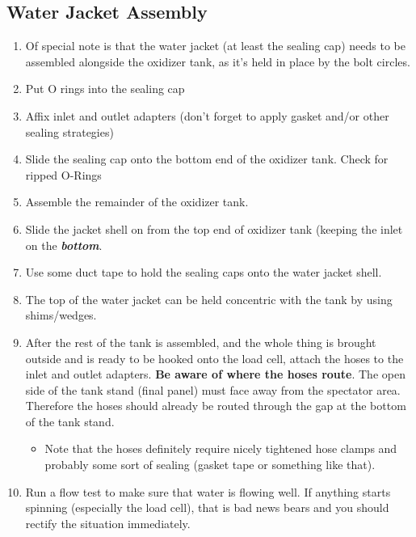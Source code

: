 \documentclass[11pt]{article}
\begin{document}
\subsection{Water Jacket Assembly}

\begin{enumerate}
	\item Of special note is that the water jacket (at least the sealing cap) needs to be assembled alongside the oxidizer tank, as it's held in place by the bolt circles.
	\item Put O rings into the sealing cap
	\item Affix inlet and outlet adapters (don't forget to apply gasket and/or other sealing strategies)
	\item Slide the sealing cap onto the bottom end of the oxidizer tank. Check for ripped O-Rings
	\item Assemble the remainder of the oxidizer tank.
	\item Slide the jacket shell on from the top end of oxidizer tank (keeping the inlet on the \textbf{\textit{bottom}}.
	\item Use some duct tape to hold the sealing caps onto the water jacket shell.
	\item The top of the water jacket can be held concentric with the tank by using shims/wedges.
	\item After the rest of the tank is assembled, and the whole thing is brought outside and is ready to be hooked onto the load cell, attach the hoses to the inlet and outlet adapters. \textbf{Be aware of where the hoses route}. The open side of the tank stand (final panel) must face away from the spectator area. Therefore the hoses should already be routed through the gap at the bottom of the tank stand.
		\begin{itemize}
			\item Note that the hoses definitely require nicely tightened hose clamps and probably some sort of sealing (gasket tape or something like that).
		\end{itemize}
	\item Run a flow test to make sure that water is flowing well. If anything starts spinning (especially the load cell), that is bad news bears and you should rectify the situation immediately.
\end{enumerate}
\end{document}
